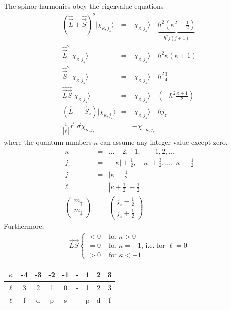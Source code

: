\documentclass[11pt,a4paper]{report}
\begin{document}
The spinor harmonics obey the eigenvalue equations
\begin{eqnarray}
\left(\hat{\vec{L}}+\hat{\vec{S}}\right)^2|\chi_{\kappa,j_z}\rangle
&=&|\chi_{\kappa,j_z}\rangle\quad
\underbrace{\hbar^2(\kappa^2-\frac{1}{2})}_{\hbar^2j(j+1)}
\\
\hat{\vec{L}}^2|\chi_{\kappa,j_z}\rangle
&=&|\chi_{\kappa,j_z}\rangle\quad\hbar^2\kappa(\kappa+1)
\\
\hat{\vec{S}}^2|\chi_{\kappa,j_z}\rangle
&=&|\chi_{\kappa,j_z}\rangle\quad\hbar^2\frac{3}{4}
\\
\hat{\vec{L}}\hat{\vec{S}}|\chi_{\kappa,j_z}\rangle
&=&|\chi_{\kappa,j_z}\rangle
\quad\left(-\hbar^2\frac{\kappa+1}{2}\right)
\label{eq:lsspinorharmonic}
\\
\left(\hat{L}_z+\hat{S}_z\right)|\chi_{\kappa,j_z}\rangle
&=&|\chi_{\kappa,j_z}\rangle\quad\hbar j_z
\\
\frac{1}{|\vec{r}|}\vec{r}\;\vec{\sigma}\chi_{\kappa,j_z}&=&-\chi_{-\kappa,j_z}
\end{eqnarray}
where the quantum numbers $\kappa$ can assume any integer value except zero.
\begin{eqnarray}
\kappa&=&\ldots,-2,-1,\qquad 1,2,\ldots
\\
j_z&=&-|\kappa|+\frac{1}{2},-|\kappa|+\frac{3}{2},\ldots,|\kappa|-\frac{1}{2}
\\
j&=& |\kappa|-\frac{1}{2}
\\
\ell&=&|\kappa+\frac{1}{2}|-\frac{1}{2}
\\
\left(\begin{array}{c} m_{\uparrow}\\m_{\downarrow}\end{array}\right)
&=&\left(\begin{array}{c} j_z-\frac{1}{2}\\j_z+\frac{1}{2}\end{array}\right)
\end{eqnarray}
Furthermore, 
\begin{eqnarray}
\vec{L}\vec{S}
\begin{cases}
<0 & \text{ for $\kappa >0$}\\
=0 & \text{ for $\kappa =-1$, i.e. for $\ell=0$}\\
>0 & \text{ for $\kappa <-1$}
\end{cases}
\end{eqnarray}

\begin{center}
\begin{tabular}{|c|c|c|c|c|c|c|c|c|}
\hline
$\kappa$ & -4 & -3 & -2 & -1 & - & 1 & 2 & 3 \\
\hline
$\ell$   &  3 &  2 &  1 &  0 & - & 1 & 2 & 3 \\
\hline
$\ell$   &  f &  d &  p &  s & - & p & d & f \\
\hline
\end{tabular}
\end{center}
\end{document}
